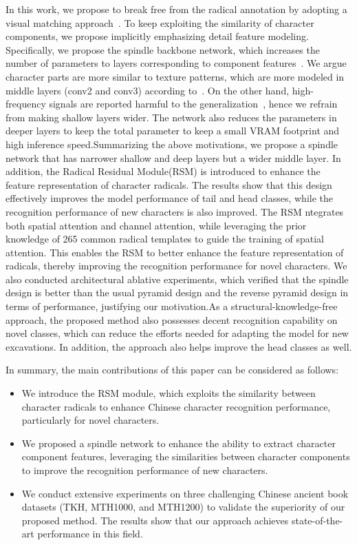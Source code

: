 In this work, we propose to break free from the radical annotation by adopting a visual matching approach~\cite{vsdf}. 
To keep exploiting the similarity of character components, we propose implicitly emphasizing detail feature modeling.  
Specifically, we propose the spindle backbone network, which increases the number of parameters to layers corresponding to component features~\cite{mobile}. 
We argue character parts are more similar to texture patterns, which are more modeled in middle layers (conv2 and conv3) according to~\cite{dissection}.
On the other hand, high-frequency signals are reported harmful to the generalization~\cite{hfharm,hffilter}, hence we refrain from making shallow layers wider. 
The network also reduces the parameters in deeper layers to keep the total parameter to keep a small VRAM footprint and high inference speed.Summarizing the above motivations, we propose a spindle network that has narrower shallow and deep layers but a wider middle layer. 
In addition, the Radical Residual Module(RSM) is introduced to enhance the feature representation of character radicals.
The results show that this design effectively improves the model performance of tail and head classes, while the recognition performance of new characters is also improved. The RSM ntegrates both spatial attention and channel attention, while leveraging the prior knowledge of 265 common radical templates to guide the training of spatial attention. This enables the RSM to better enhance the feature representation of radicals, thereby improving the recognition performance for novel characters.
We also conducted architectural ablative experiments, which verified that the spindle design is better than the usual pyramid design and the reverse pyramid design in terms of performance, justifying our motivation.As a structural-knowledge-free approach, the proposed method also possesses decent recognition capability on novel classes, which can reduce the efforts needed for adapting the model for new excavations. In addition, the approach also helps improve the head classes as well. 

In summary, the main contributions of this paper can be considered as follows:
\begin{itemize}
\item We introduce the RSM module, which exploits the similarity between character radicals to enhance Chinese character recognition performance, particularly for novel characters.
\item We proposed a spindle network to enhance the ability to extract character component features, leveraging the similarities between character components to improve the recognition performance of new characters.
\item We conduct extensive experiments on three challenging Chinese ancient book datasets (TKH, MTH1000, and MTH1200) to validate the superiority of our proposed method. The results show that our approach achieves state-of-the-art performance in this field.
\end{itemize}
